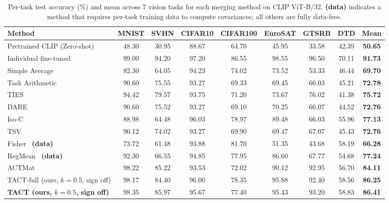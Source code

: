 \begin{table}[t]
\caption{Per-task test accuracy (\%) and mean across 7 vision tasks for each merging method on CLIP ViT-B/32. \textbf{(data)} indicates a method that requires per-task training data to compute covariances; all others are fully data-free.}
\label{tab:main}
\centering
\small
\setlength{\tabcolsep}{4pt}
\begin{tabular}{lcccccccc}
\toprule
Method & MNIST & SVHN & CIFAR10 & CIFAR100 & EuroSAT & GTSRB & DTD & \textbf{Mean} \\
\midrule
Pretrained CLIP (Zero-shot) & 48.30 & 30.95 & 88.67 & 64.70 & 45.95 & 33.58 & 42.39 & \textbf{50.65} \\
Individual fine-tuned & 99.00 & 94.20 & 97.20 & 86.55 & 98.55 & 96.50 & 70.11 & \textbf{91.73} \\
Simple Average~\citep{wortsman2022model} & 82.30 & 64.05 & 94.23 & 74.02 & 73.52 & 53.33 & 46.44 & \textbf{69.70} \\
Task Arithmetic~\citep{ilharco2023editing} & 90.60 & 75.55 & 93.27 & 69.33 & 69.45 & 66.03 & 45.21 & \textbf{72.78} \\
TIES~\citep{yadav2023ties} & 94.42 & 79.57 & 93.75 & 71.20 & 73.67 & 76.02 & 41.38 & \textbf{75.72} \\
DARE~\citep{yu2024language} & 90.60 & 75.52 & 93.27 & 69.10 & 70.25 & 66.07 & 44.52 & \textbf{72.76} \\
Iso-C~\citep{marczak2025isoc} & 88.98 & 64.48 & 96.03 & 78.97 & 89.48 & 66.03 & 55.96 & \textbf{77.13} \\
TSV~\citep{gargiulo2025tsv} & 90.12 & 74.02 & 93.27 & 69.90 & 69.47 & 67.07 & 45.43 & \textbf{72.76} \\
Fisher~\citep{matena2022merging} {\footnotesize\textbf{(data)}} & 73.72 & 61.48 & 93.88 & 81.70 & 51.35 & 43.68 & 58.19 & \textbf{66.28} \\
RegMean~\citep{jin2023dataless} {\footnotesize\textbf{(data)}} & 92.30 & 66.55 & 94.85 & 77.95 & 86.60 & 67.77 & 54.68 & \textbf{77.24} \\
ACTMat~\citep{hameed2026actmat} & 98.22 & 85.22 & 93.53 & 72.02 & 90.12 & 92.95 & 56.70 & \textbf{84.11} \\
TACT-full (ours, $k{=}0.5$, sign off) & 98.17 & 84.40 & 96.00 & 78.35 & 95.88 & 92.40 & 58.56 & \textbf{86.25} \\
\textbf{TACT (ours, $k{=}0.5$, sign off)} & 98.35 & 85.97 & 95.67 & 77.40 & 95.43 & 93.20 & 58.83 & \textbf{86.41} \\
\bottomrule
\end{tabular}
\end{table}